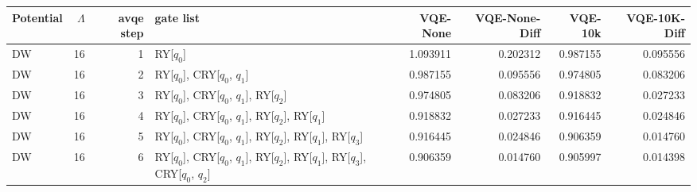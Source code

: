 \begin{tabular}{lrrlrrrr}
\toprule
Potential & $\Lambda$ & avqe step & gate list & VQE-None & VQE-None-Diff & VQE-10k & VQE-10K-Diff \\
\midrule
DW & 16 & 1 & RY[$q_0$] & 1.093911 & 0.202312 & 0.987155 & 0.095556 \\
DW & 16 & 2 & RY[$q_0$], CRY[$q_0$, $q_1$] & 0.987155 & 0.095556 & 0.974805 & 0.083206 \\
DW & 16 & 3 & RY[$q_0$], CRY[$q_0$, $q_1$], RY[$q_2$] & 0.974805 & 0.083206 & 0.918832 & 0.027233 \\
DW & 16 & 4 & RY[$q_0$], CRY[$q_0$, $q_1$], RY[$q_2$], RY[$q_1$] & 0.918832 & 0.027233 & 0.916445 & 0.024846 \\
DW & 16 & 5 & RY[$q_0$], CRY[$q_0$, $q_1$], RY[$q_2$], RY[$q_1$], RY[$q_3$] & 0.916445 & 0.024846 & 0.906359 & 0.014760 \\
DW & 16 & 6 & RY[$q_0$], CRY[$q_0$, $q_1$], RY[$q_2$], RY[$q_1$], RY[$q_3$], CRY[$q_0$, $q_2$] & 0.906359 & 0.014760 & 0.905997 & 0.014398 \\
\bottomrule
\end{tabular}
